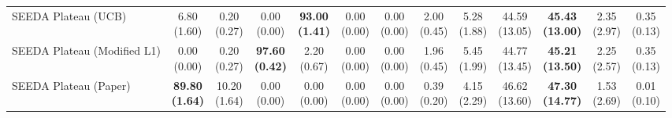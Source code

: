 \begin{table}[H]
{\begin{tabular}{l|cccccc|cccccc}
SEEDA Plateau (UCB) & \makecell{6.80 \\ (1.60)} & \makecell{0.20 \\ (0.27)} & {\cellcolor[HTML]{C8E6C9}} \makecell{0.00 \\ (0.00)} & \bfseries \makecell{93.00 \\ (1.41)} & \makecell{0.00 \\ (0.00)} & \makecell{0.00 \\ (0.00)} & \makecell{2.00 \\ (0.45)} & \makecell{5.28 \\ (1.88)} & {\cellcolor[HTML]{C8E6C9}} \makecell{44.59 \\ (13.05)} & \bfseries \makecell{45.43 \\ (13.00)} & \makecell{2.35 \\ (2.97)} & \makecell{0.35 \\ (0.13)} \\
SEEDA Plateau (Modified L1) & \makecell{0.00 \\ (0.00)} & \makecell{0.20 \\ (0.27)} & {\cellcolor[HTML]{C8E6C9}} \bfseries \makecell{97.60 \\ (0.42)} & \makecell{2.20 \\ (0.67)} & \makecell{0.00 \\ (0.00)} & \makecell{0.00 \\ (0.00)} & \makecell{1.96 \\ (0.45)} & \makecell{5.45 \\ (1.99)} & {\cellcolor[HTML]{C8E6C9}} \makecell{44.77 \\ (13.45)} & \bfseries \makecell{45.21 \\ (13.50)} & \makecell{2.25 \\ (2.57)} & \makecell{0.35 \\ (0.13)} \\
SEEDA Plateau (Paper) & \bfseries \makecell{89.80 \\ (1.64)} & \makecell{10.20 \\ (1.64)} & {\cellcolor[HTML]{C8E6C9}} \makecell{0.00 \\ (0.00)} & \makecell{0.00 \\ (0.00)} & \makecell{0.00 \\ (0.00)} & \makecell{0.00 \\ (0.00)} & \makecell{0.39 \\ (0.20)} & \makecell{4.15 \\ (2.29)} & {\cellcolor[HTML]{C8E6C9}} \makecell{46.62 \\ (13.60)} & \bfseries \makecell{47.30 \\ (14.77)} & \makecell{1.53 \\ (2.69)} & \makecell{0.01 \\ (0.10)} \\
\bottomrule
\end{tabular}
}%
\end{table}
